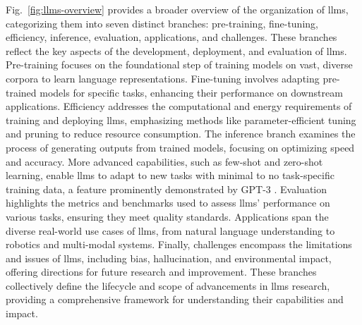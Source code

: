 Fig.~\ref{fig:llms-overview} provides a broader overview of the organization of \glspl{llm}, categorizing them into seven distinct branches: pre-training, fine-tuning, efficiency, inference, evaluation, applications, and challenges.
These branches reflect the key aspects of the development, deployment, and evaluation of \glspl{llm}.
Pre-training focuses on the foundational step of training models on vast, diverse corpora to learn language representations.
Fine-tuning involves adapting pre-trained models for specific tasks, enhancing their performance on downstream applications.
Efficiency addresses the computational and energy requirements of training and deploying \glspl{llm}, emphasizing methods like parameter-efficient tuning and pruning to reduce resource consumption.
The inference branch examines the process of generating outputs from trained models, focusing on optimizing speed and accuracy.
More advanced capabilities, such as few-shot and zero-shot learning, enable \glspl{llm} to adapt to new tasks with minimal to no task-specific training data, a feature prominently demonstrated by GPT-3 \cite{NEURIPS2020_1457c0d6}.
Evaluation highlights the metrics and benchmarks used to assess \glspl{llm}' performance on various tasks, ensuring they meet quality standards.
Applications span the diverse real-world use cases of \glspl{llm}, from natural language understanding to robotics and multi-modal systems.
Finally, challenges encompass the limitations and issues of \glspl{llm}, including bias, hallucination, and environmental impact, offering directions for future research and improvement.
These branches collectively define the lifecycle and scope of advancements in \glspl{llm} research, providing a comprehensive framework for understanding their capabilities and impact.

